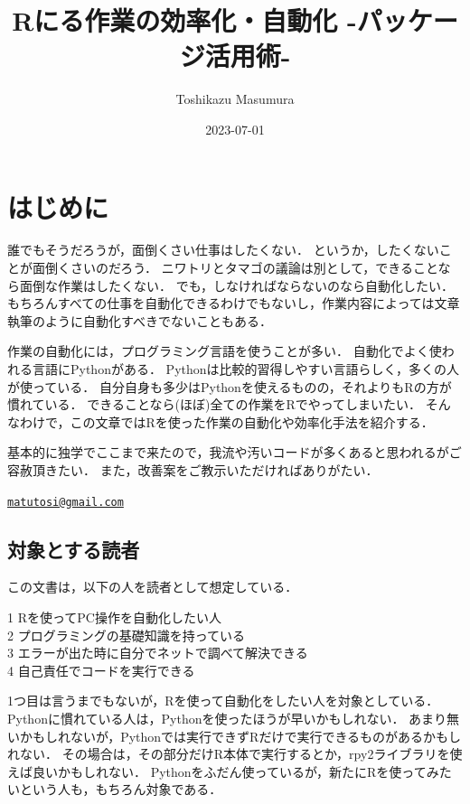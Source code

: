 \documentclass[
]{article}
\title{Rにる作業の効率化・自動化 -パッケージ活用術-}
\author{Toshikazu Masumura}
\date{2023-07-01}
\begin{document}
\maketitle

{
\setcounter{tocdepth}{2}
\tableofcontents
}
\hypertarget{ux306fux3058ux3081ux306b}{%
\section*{はじめに}\label{ux306fux3058ux3081ux306b}}

誰でもそうだろうが，面倒くさい仕事はしたくない．
というか，したくないことが面倒くさいのだろう．
ニワトリとタマゴの議論は別として，できることなら面倒な作業はしたくない．
でも，しなければならないのなら自動化したい．
もちろんすべての仕事を自動化できるわけでもないし，作業内容によっては文章執筆のように自動化すべきでないこともある．

作業の自動化には，プログラミング言語を使うことが多い．
自動化でよく使われる言語にPythonがある．
Pythonは比較的習得しやすい言語らしく，多くの人が使っている．
自分自身も多少はPythonを使えるものの，それよりもRの方が慣れている．
できることなら(ほぼ)全ての作業をRでやってしまいたい．
そんなわけで，この文章ではRを使った作業の自動化や効率化手法を紹介する．

基本的に独学でここまで来たので，我流や汚いコードが多くあると思われるがご容赦頂きたい．
また，改善案をご教示いただければありがたい．

\href{mailto:matutosi@gmail.com}{\nolinkurl{matutosi@gmail.com}}

\hypertarget{ux5bfeux8c61ux3068ux3059ux308bux8aadux8005}{%
\subsection{対象とする読者}\label{ux5bfeux8c61ux3068ux3059ux308bux8aadux8005}}

この文書は，以下の人を読者として想定している．

1 Rを使ってPC操作を自動化したい人\\
2 プログラミングの基礎知識を持っている\\
3 エラーが出た時に自分でネットで調べて解決できる\\
4 自己責任でコードを実行できる

1つ目は言うまでもないが，Rを使って自動化をしたい人を対象としている．
Pythonに慣れている人は，Pythonを使ったほうが早いかもしれない．
あまり無いかもしれないが，Pythonでは実行できずRだけで実行できるものがあるかもしれない．
その場合は，その部分だけR本体で実行するとか，rpy2ライブラリを使えば良いかもしれない．
Pythonをふだん使っているが，新たにRを使ってみたいという人も，もちろん対象である．
\end{document}
